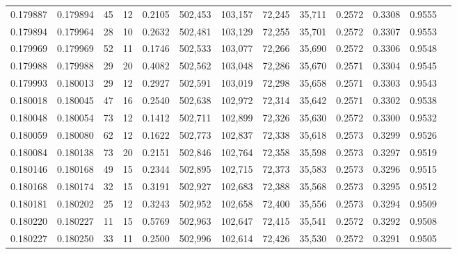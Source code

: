 \begin{tabular}{rrrrrrrrrrrrr}
0.179887 & 0.179894 &    45 &  12 &                                     0.2105 & 502,453 & 103,157 &  72,245 &  35,711 & 0.2572 & 0.3308 & 0.9555 \\
0.179894 & 0.179964 &    28 &  10 &                                     0.2632 & 502,481 & 103,129 &  72,255 &  35,701 & 0.2572 & 0.3307 & 0.9553 \\
0.179969 & 0.179969 &    52 &  11 &                                     0.1746 & 502,533 & 103,077 &  72,266 &  35,690 & 0.2572 & 0.3306 & 0.9548 \\
0.179988 & 0.179988 &    29 &  20 &                                     0.4082 & 502,562 & 103,048 &  72,286 &  35,670 & 0.2571 & 0.3304 & 0.9545 \\
0.179993 & 0.180013 &    29 &  12 &                                     0.2927 & 502,591 & 103,019 &  72,298 &  35,658 & 0.2571 & 0.3303 & 0.9543 \\
0.180018 & 0.180045 &    47 &  16 &                                     0.2540 & 502,638 & 102,972 &  72,314 &  35,642 & 0.2571 & 0.3302 & 0.9538 \\
0.180048 & 0.180054 &    73 &  12 &                                     0.1412 & 502,711 & 102,899 &  72,326 &  35,630 & 0.2572 & 0.3300 & 0.9532 \\
0.180059 & 0.180080 &    62 &  12 &                                     0.1622 & 502,773 & 102,837 &  72,338 &  35,618 & 0.2573 & 0.3299 & 0.9526 \\
0.180084 & 0.180138 &    73 &  20 &                                     0.2151 & 502,846 & 102,764 &  72,358 &  35,598 & 0.2573 & 0.3297 & 0.9519 \\
0.180146 & 0.180168 &    49 &  15 &                                     0.2344 & 502,895 & 102,715 &  72,373 &  35,583 & 0.2573 & 0.3296 & 0.9515 \\
0.180168 & 0.180174 &    32 &  15 &                                     0.3191 & 502,927 & 102,683 &  72,388 &  35,568 & 0.2573 & 0.3295 & 0.9512 \\
0.180181 & 0.180202 &    25 &  12 &                                     0.3243 & 502,952 & 102,658 &  72,400 &  35,556 & 0.2573 & 0.3294 & 0.9509 \\
0.180220 & 0.180227 &    11 &  15 &                                     0.5769 & 502,963 & 102,647 &  72,415 &  35,541 & 0.2572 & 0.3292 & 0.9508 \\
0.180227 & 0.180250 &    33 &  11 &                                     0.2500 & 502,996 & 102,614 &  72,426 &  35,530 & 0.2572 & 0.3291 & 0.9505 \\

\end{tabular}
